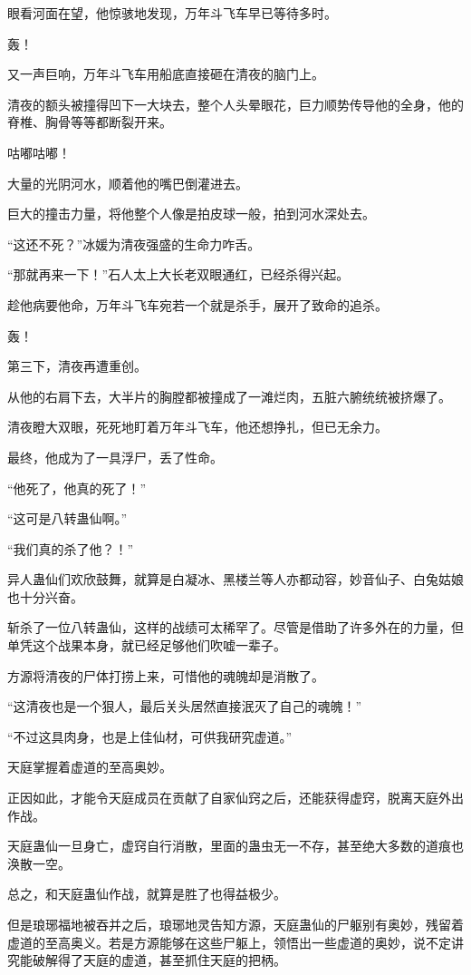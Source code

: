 \begin{this_body}
眼看河面在望，他惊骇地发现，万年斗飞车早已等待多时。

轰！

又一声巨响，万年斗飞车用船底直接砸在清夜的脑门上。

清夜的额头被撞得凹下一大块去，整个人头晕眼花，巨力顺势传导他的全身，他的脊椎、胸骨等等都断裂开来。

咕嘟咕嘟！

大量的光阴河水，顺着他的嘴巴倒灌进去。

巨大的撞击力量，将他整个人像是拍皮球一般，拍到河水深处去。

“这还不死？”冰媛为清夜强盛的生命力咋舌。

“那就再来一下！”石人太上大长老双眼通红，已经杀得兴起。

趁他病要他命，万年斗飞车宛若一个就是杀手，展开了致命的追杀。

轰！

第三下，清夜再遭重创。

从他的右肩下去，大半片的胸膛都被撞成了一滩烂肉，五脏六腑统统被挤爆了。

清夜瞪大双眼，死死地盯着万年斗飞车，他还想挣扎，但已无余力。

最终，他成为了一具浮尸，丢了性命。

“他死了，他真的死了！”

“这可是八转蛊仙啊。”

“我们真的杀了他？！”

异人蛊仙们欢欣鼓舞，就算是白凝冰、黑楼兰等人亦都动容，妙音仙子、白兔姑娘也十分兴奋。

斩杀了一位八转蛊仙，这样的战绩可太稀罕了。尽管是借助了许多外在的力量，但单凭这个战果本身，就已经足够他们吹嘘一辈子。

方源将清夜的尸体打捞上来，可惜他的魂魄却是消散了。

“这清夜也是一个狠人，最后关头居然直接泯灭了自己的魂魄！”

“不过这具肉身，也是上佳仙材，可供我研究虚道。”

天庭掌握着虚道的至高奥妙。

正因如此，才能令天庭成员在贡献了自家仙窍之后，还能获得虚窍，脱离天庭外出作战。

天庭蛊仙一旦身亡，虚窍自行消散，里面的蛊虫无一不存，甚至绝大多数的道痕也涣散一空。

总之，和天庭蛊仙作战，就算是胜了也得益极少。

但是琅琊福地被吞并之后，琅琊地灵告知方源，天庭蛊仙的尸躯别有奥妙，残留着虚道的至高奥义。若是方源能够在这些尸躯上，领悟出一些虚道的奥妙，说不定讲究能破解得了天庭的虚道，甚至抓住天庭的把柄。


\end{this_body}
